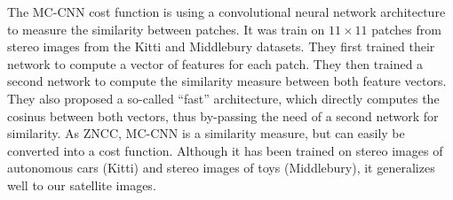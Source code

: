 \begin{example}
	The MC-CNN cost function \cite{zbontar_stereo_2016} is using a convolutional neural network architecture to measure the similarity between patches. It was train on $11\times 11$ patches from stereo images from the Kitti \cite{geiger_vision_2013, menze_object_2015} and Middlebury \cite{scharstein_taxonomy_2001,scharstein_high-accuracy_2003,hirschmuller_evaluation_2007,scharstein_learning_2007,scharstein_high-resolution_2014} datasets. They first trained their network to compute a vector of features for each patch. They then trained a second network to compute the similarity measure between both feature vectors. They also proposed a so-called ``fast'' architecture, which directly computes the cosinus between both vectors, thus by-passing the need of a second network for similarity. As ZNCC, MC-CNN is a similarity measure, but can easily be converted into a cost function. Although it has been trained on stereo images of autonomous cars (Kitti) and stereo images of toys (Middlebury), it generalizes well to our satellite images.
\end{example}
	
